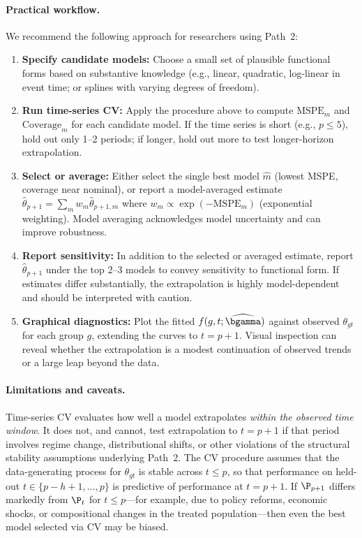 \paragraph{Practical workflow.}
We recommend the following approach for researchers using Path~2:

\begin{enumerate}
    \item \textbf{Specify candidate models:} Choose a small set of plausible functional forms based on substantive knowledge (e.g., linear, quadratic, log-linear in event time; or splines with varying degrees of freedom).
    \item \textbf{Run time-series CV:} Apply the procedure above to compute $\text{MSPE}_m$ and $\text{Coverage}_m$ for each candidate model. If the time series is short (e.g., $p \leq 5$), hold out only 1--2 periods; if longer, hold out more to test longer-horizon extrapolation.
    \item \textbf{Select or average:} Either select the single best model $\widehat{m}$ (lowest MSPE, coverage near nominal), or report a model-averaged estimate $\widehat{\theta}_{p+1} = \sum_m w_m \widehat{\theta}_{p+1,m}$ where $w_m \propto \exp(-\text{MSPE}_m)$ (exponential weighting). Model averaging acknowledges model uncertainty and can improve robustness.
    \item \textbf{Report sensitivity:} In addition to the selected or averaged estimate, report $\widehat{\theta}_{p+1}$ under the top 2--3 models to convey sensitivity to functional form. If estimates differ substantially, the extrapolation is highly model-dependent and should be interpreted with caution.
    \item \textbf{Graphical diagnostics:} Plot the fitted $f(g, t; \widehat{\bgamma})$ against observed $\theta_{gt}$ for each group $g$, extending the curves to $t = p+1$. Visual inspection can reveal whether the extrapolation is a modest continuation of observed trends or a large leap beyond the data.
\end{enumerate}

\paragraph{Limitations and caveats.}
Time-series CV evaluates how well a model extrapolates \emph{within the observed time window}. It does not, and cannot, test extrapolation to $t = p+1$ if that period involves regime change, distributional shifts, or other violations of the structural stability assumptions underlying Path~2. The CV procedure assumes that the data-generating process for $\theta_{gt}$ is stable across $t \leq p$, so that performance on held-out $t \in \{p-h+1, \ldots, p\}$ is predictive of performance at $t = p+1$. If $\P_{p+1}$ differs markedly from $\P_t$ for $t \leq p$---for example, due to policy reforms, economic shocks, or compositional changes in the treated population---then even the best model selected via CV may be biased.

